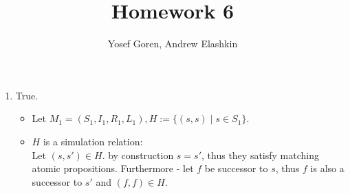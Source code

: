 \documentclass{article}
\begin{document}
\author{Yosef Goren, Andrew Elashkin}
\title{Homework 6}
\maketitle
\section{}
\begin{enumerate}[label=\alph*.]
    \item True.
    \begin{itemize}
        \item Let $M_1=(S_1,I_1,R_1,L_1), H:=\{(s,s)\mid s\in S_1\}$.
        \item $H$ is a simulation relation:\\
        Let $(s,s')\in H$. by construction $s=s'$, thus they satisfy matching
        atomic propositions. Furthermore - let $f$ be successor to $s$,
        thus $f$ is also a successor to $s'$ and $(f,f)\in H$.\\
        

\end{itemize}
\end{enumerate}
\end{document}
